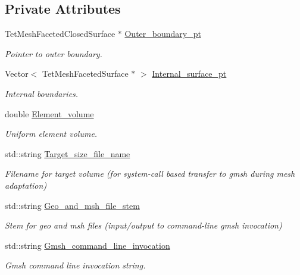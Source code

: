 \subsection*{Private Attributes}
\begin{DoxyCompactItemize}
\item 
Tet\+Mesh\+Faceted\+Closed\+Surface $\ast$ \hyperlink{classoomph_1_1GmshParameters_a310ecaffe67e67b334aafaca82c4d50a}{Outer\+\_\+boundary\+\_\+pt}
\begin{DoxyCompactList}\small\item\em Pointer to outer boundary. \end{DoxyCompactList}\item 
Vector$<$ Tet\+Mesh\+Faceted\+Surface $\ast$ $>$ \hyperlink{classoomph_1_1GmshParameters_aaa4afdde73a7fc67d5c2ba2976235381}{Internal\+\_\+surface\+\_\+pt}
\begin{DoxyCompactList}\small\item\em Internal boundaries. \end{DoxyCompactList}\item 
double \hyperlink{classoomph_1_1GmshParameters_aa7993da33a0468681e5f661ac5b00bfb}{Element\+\_\+volume}
\begin{DoxyCompactList}\small\item\em Uniform element volume. \end{DoxyCompactList}\item 
std\+::string \hyperlink{classoomph_1_1GmshParameters_ae2f3eabe211e22c18df2bf7b093bbdfb}{Target\+\_\+size\+\_\+file\+\_\+name}
\begin{DoxyCompactList}\small\item\em Filename for target volume (for system-\/call based transfer to gmsh during mesh adaptation) \end{DoxyCompactList}\item 
std\+::string \hyperlink{classoomph_1_1GmshParameters_a478a41ae94e177f02d38db90ea27d582}{Geo\+\_\+and\+\_\+msh\+\_\+file\+\_\+stem}
\begin{DoxyCompactList}\small\item\em Stem for geo and msh files (input/output to command-\/line gmsh invocation) \end{DoxyCompactList}\item 
std\+::string \hyperlink{classoomph_1_1GmshParameters_a5605a771916b353925ad55b6a6e914cb}{Gmsh\+\_\+command\+\_\+line\+\_\+invocation}
\begin{DoxyCompactList}\small\item\em Gmsh command line invocation string. \end{DoxyCompactList}\item 

\end{DoxyCompactItemize}
